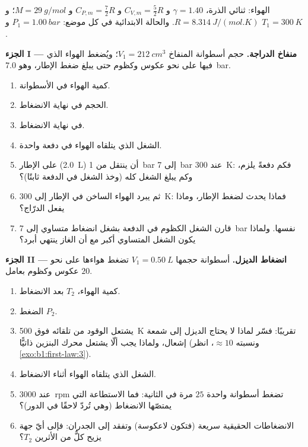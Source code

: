 \begin{problem}
\label{pb:b1:first-law:1}
الهواء:  ثنائي الذرة، $\gamma = 1.40$ و $C_{V,m} = \tfrac52 R$ و $C_{P,m} =
\tfrac72 R$ و $M = \qty{29}{g/mol}$؛ و $R = \qty{8.314}{J/(mol.K)}$. والحالة
الابتدائية في كل موضع: $P_1 = \qty{1.00}{bar}$ و $T_1 = \qty{300}{K}$.

\medskip
\noindent\textbf{الجزء I --- منفاخ الدراجة.}
حجم أسطوانة المنفاخ $V_1 = \qty{212}{cm^3}$؛ ويُضغط الهواء الذي
فيها على نحو عكوس وكظوم حتى يبلغ ضغط الإطار، وهو
\qty{7.0}{bar}.
\begin{enumerate}
  \item كمية الهواء في الأسطوانة.
  \item الحجم في نهاية الانضغاط.
  \item {} في نهاية الانضغاط.
  \item الشغل الذي يتلقاه الهواء في دفعة واحدة.
  \item على الإطار (\qty{2.0}{L}) أن ينتقل من \qty{1}{bar} إلى
        \qty{7}{bar} عند \qty{300}{K}: فكم دفعةً يلزم، وكم يبلغ الشغل
        كله (وخذ الشغل في الدفعة ثابتًا)؟
  \item ثم يبرد الهواء الساخن في الإطار إلى \qty{300}{K}: فماذا يحدث
        لضغط الإطار، وماذا يفعل الدرّاج؟
  \item قارن الشغل الكظوم في الدفعة بشغل انضغاط متساوي 
        إلى \qty{7}{bar} نفسها. ولماذا يكون الشغل المتساوي  أكبر
        مع أن الغاز ينتهي أبرد؟
\end{enumerate}

\medskip
\noindent\textbf{الجزء II --- انضغاط الديزل.}
أسطوانة حجمها $V_1 = \qty{0.50}{L}$ تضغط هواءها على نحو عكوس
وكظوم بعامل $20$.
\begin{enumerate}[resume]
  \item كمية الهواء،  $T_2$ بعد الانضغاط.
  \item الضغط $P_2$.
  \item يشتعل الوقود من تلقائه فوق \qty{500}{K} تقريبًا: فسّر لماذا
        لا يحتاج الديزل إلى شمعة إشعال، ولماذا يجب ألّا يشتعل
        محرك البنزين ذاتيًّا (ونسبته $\approx 10$، انظر \cref{exo:b1:first-law:3}).
  \item الشغل الذي يتلقاه الهواء أثناء الانضغاط.
  \item عند \qty{3000}{rpm} تضغط أسطوانة واحدة $25$ مرة في الثانية:
        فما الاستطاعة التي يمتصّها الانضغاط (وهي تُردّ لاحقًا في
        الدور)؟
  \item الانضغاطات الحقيقية سريعة (فتكون لاعكوسة) وتفقد  إلى
        الجدران: فإلى أيّ جهة يزيح كلٌّ من الأثرين $T_2$؟
\end{enumerate}


\end{problem}
